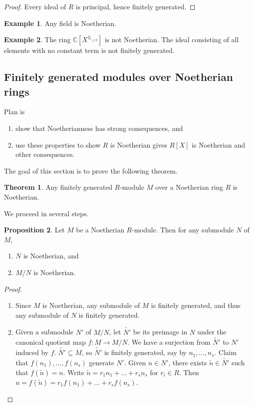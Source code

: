 \documentclass{article}
\newcommand{\Q}{\mathbb{Q}}
\newcommand{\C}{\mathbb{C}}
\newcommand{\rb}[1]{\left( #1 \right)}
\renewcommand{\sb}[1]{\left[ #1 \right]}
\theoremstyle{definition}\newtheorem{definition}{Definition}[subsection]
\theoremstyle{definition}\newtheorem{remark}[definition]{Remark}
\theoremstyle{definition}\newtheorem*{example}{Example}
\theoremstyle{definition}\newtheorem*{note}{Note}
\newtheorem{proposition}[definition]{Proposition}
\newtheorem{theorem}[definition]{Theorem}
\begin{document}
\begin{proof}
Every ideal of $ R $ is principal, hence finitely generated.
\end{proof}

\begin{example}
Any field is Noetherian.
\end{example}

\begin{example}
The ring $ \C\sb{X^{\Q_{\ge 0}}} $ is not Noetherian. The ideal consisting of all elements with no constant term is not finitely generated.
\end{example}

\subsection{Finitely generated modules over Noetherian rings}

Plan is
\begin{enumerate}
\item show that Noetherianness has strong consequences, and
\item use these properties to show $ R $ is Noetherian gives $ R\sb{X} $ is Noetherian and other consequences.
\end{enumerate}
The goal of this section is to prove the following theorem.

\begin{theorem}
\label{thm:8.2.1}
Any finitely generated $ R $-module $ M $ over a Noetherian ring $ R $ is Noetherian.
\end{theorem}

We proceed in several steps.

\begin{proposition}
Let $ M $ be a Noetherian $ R $-module. Then for any submodule $ N $ of $ M $,
\begin{enumerate}
\item $ N $ is Noetherian, and
\item $ M / N $ is Noetherian.
\end{enumerate}
\end{proposition}

\begin{proof}
\hfill
\begin{enumerate}
\item Since $ M $ is Noetherian, any submodule of $ M $ is finitely generated, and thus any submodule of $ N $ is finitely generated.
\item Given a submodule $ N' $ of $ M / N $, let $ \widetilde{N'} $ be its preimage in $ N $ under the canonical quotient map $ f : M \to M / N $. We have a surjection from $ \widetilde{N'} $ to $ N' $ induced by $ f $. $ \widetilde{N'} \subseteq M $, so $ \widetilde{N'} $ is finitely generated, say by $ n_1, \dots, n_s $. Claim that $ f\rb{n_1}, \dots, f\rb{n_s} $ generate $ N' $. Given $ n \in N' $, there exists $ \widetilde{n} \in \widetilde{N'} $ such that $ f\rb{\widetilde{n}} = n $. Write $ \widetilde{n} = r_1n_1 + \dots + r_sn_s $ for $ r_i \in R $. Then $ n = f\rb{\widetilde{n}} = r_1f\rb{n_1} + \dots + r_sf\rb{n_s} $.
\end{enumerate}
\end{proof}
\end{document}
